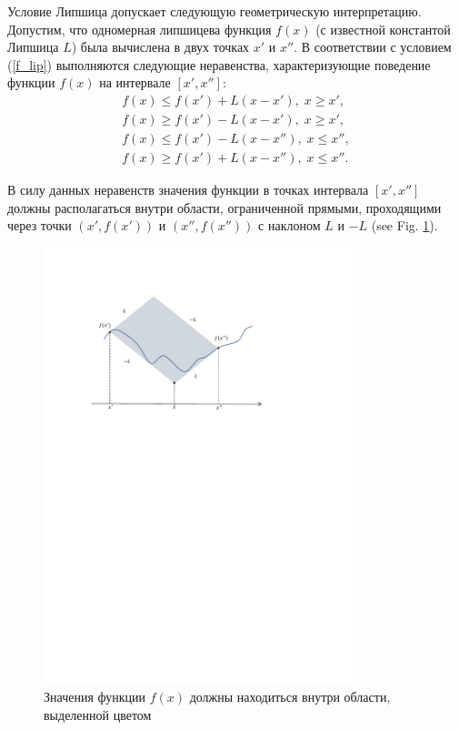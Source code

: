 \documentclass[preprint,12pt]{elsarticle}
\begin{document}
Условие Липшица допускает следующую геометрическую интерпретацию. Допустим, что одномерная липшицева функция $f(x)$ (с известной константой Липшица $L$) была вычислена в двух точках $x'$ и $x''$. В соответствии с условием (\ref{f_lip}) выполняются следующие неравенства, характеризующие поведение функции $f(x)$ на интервале $[x', x'']$:
\begin{gather*}
	f(x) \leq f(x') + L(x-x'), \; x \geq x',\\
	f(x) \geq f(x') - L(x-x'), \; x \geq x',\\
	f(x) \leq f(x') - L(x-x''), \; x \leq x'',\\
	f(x) \geq f(x') + L(x-x''), \; x \leq x''.
\end{gather*}

В силу данных неравенств значения функции в точках интервала $[x', x'']$ должны располагаться внутри области, ограниченной прямыми, проходящими через точки $(x', f(x'))$ и $(x'', f(x''))$ с наклоном $L$ и $-L$ (see Fig. \ref{fig1}).

\begin{figure}
\centering
\includegraphics[width=0.8\textwidth]{Fig1.pdf}
\caption{Значения функции $f(x)$ должны находиться внутри области, выделенной цветом} \label{fig1}
\end{figure}
\end{document}
